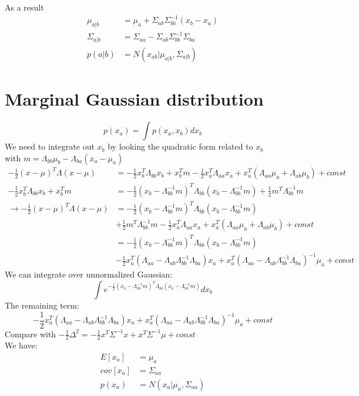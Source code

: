 \documentclass[12pt,letterpaper]{article}
\begin{document}
	As a result
	\begin{align*}
	    \mu_{a|b} &= \mu_a + \Sigma_{ab}\Sigma_{bb}^{-1}(x_b - x_a)\\
	    \Sigma_{a|b} &= \Sigma_{aa} - \Sigma_{ab}\Sigma_{bb}^{-1}\Sigma_{ba}\\
	    p(a|b) &= N(x_{ab}|\mu_{a|b},\Sigma_{a|b})
	\end{align*}
	
	\section{Marginal Gaussian distribution}
	\begin{equation*}
	    p(x_a) = \int p(x_a, x_b)dx_b
	\end{equation*}
	We need to integrate out \(x_b\) by looking the quadratic form related to \(x_b\)\\
	with \(m = \Lambda_{bb}\mu_b - \Lambda_{ba}(x_a-\mu_a)\)
	\begin{align*}
	    -\frac{1}{2}(x-\mu)^T\Lambda(x-\mu) &= -\frac{1}{2}x_b^T\Lambda_{bb}x_b + x_b^Tm - \frac{1}{2}x_a^T\Lambda_{aa}x_a + x_a^T(\Lambda_{aa}\mu_a + \Lambda_{ab}\mu_b) + const\\
	    -\frac{1}{2}x_b^T\Lambda_{bb}x_b + x_b^Tm &= -\frac{1}{2}(x_b-\Lambda_{bb}^{-1}m)^T\Lambda_{bb}(x_b - \Lambda_{bb}^{-1}m) + \frac{1}{2}m^T\Lambda_{bb}^{-1}m\\
	    \rightarrow  -\frac{1}{2}(x-\mu)^T\Lambda(x-\mu) &= -\frac{1}{2}(x_b-\Lambda_{bb}^{-1}m)^T\Lambda_{bb}(x_b - \Lambda_{bb}^{-1}m)\\ &+ \frac{1}{2}m^T\Lambda_{bb}^{-1}m - \frac{1}{2}x_a^T\Lambda_{aa}x_a + x_a^T(\Lambda_{aa}\mu_a + \Lambda_{ab}\mu_b) + const\\
	    &= -\frac{1}{2}(x_b-\Lambda_{bb}^{-1}m)^T\Lambda_{bb}(x_b - \Lambda_{bb}^{-1}m)\\ & -\frac{1}{2}x_a^T(\Lambda_{aa}-\Lambda_{ab}\Lambda_{bb}^{-1}\Lambda_{ba})x_a + x_a^T(\Lambda_{aa}-\Lambda_{ab}\Lambda_{bb}^{-1}\Lambda_{ba})^{-1}\mu_a +const
	\end{align*}
	We can integrate over unnormalized Gaussian:
	\[\int e^{-\frac{1}{2}(x_b-\Lambda_{bb}^{-1}m)^T\Lambda_{bb}(x_b - \Lambda_{bb}^{-1}m)}dx_b\]
	The remaining term:
	\[-\frac{1}{2}x_a^T(\Lambda_{aa}-\Lambda_{ab}\Lambda_{bb}^{-1}\Lambda_{ba})x_a + x_a^T(\Lambda_{aa}-\Lambda_{ab}\Lambda_{bb}^{-1}\Lambda_{ba})^{-1}\mu_a +const\]
	Compare with \(-\frac{1}{2}\Delta^2 = -\frac{1}{2}x^T\Sigma^{-1}x + x^T\Sigma^{-1}\mu + const\)\\
	We have:
	\begin{equation*}
	    \begin{split}
	        E[x_a] &= \mu_a\\
	        cov[x_a] &= \Sigma_{aa}\\
	        p(x_a) &= N(x_a|\mu_a, \Sigma_{aa})
	    \end{split}
	\end{equation*}
\end{document}
